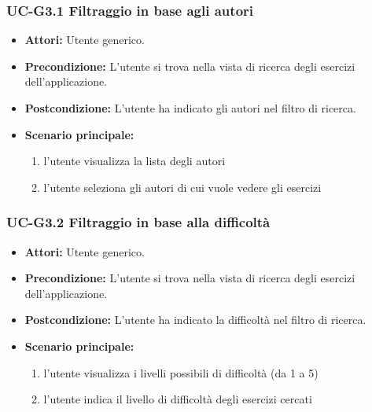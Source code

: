 \subsubsection{UC-G3.1 Filtraggio in base agli autori}
	\begin{itemize}
		\item \textbf{Attori:} Utente generico.
		\item \textbf{Precondizione: } L'utente si trova nella vista di ricerca degli esercizi dell'applicazione.
		\item \textbf{Postcondizione: } L'utente ha indicato gli autori nel filtro di ricerca.
		\item \textbf{Scenario principale:}
		\begin{enumerate}
			\item l'utente visualizza la lista degli autori
			\item l'utente seleziona gli autori di cui vuole vedere gli esercizi
		\end{enumerate}
	\end{itemize}

\subsubsection{UC-G3.2 Filtraggio in base alla difficoltà}
	\begin{itemize}
		\item \textbf{Attori:} Utente generico.
		\item \textbf{Precondizione: } L'utente si trova nella vista di ricerca degli esercizi dell'applicazione.
		\item \textbf{Postcondizione: } L'utente ha indicato la difficoltà nel filtro di ricerca.
		\item \textbf{Scenario principale:}
		\begin{enumerate}
			\item l'utente visualizza i livelli possibili di difficoltà (da 1 a 5)
			\item l'utente indica il livello di difficoltà degli esercizi cercati
		\end{enumerate}
	\end{itemize}

